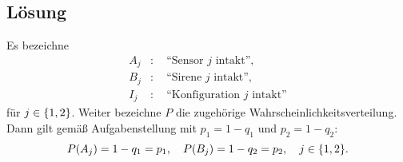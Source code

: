 \documentclass{exercise}
\begin{document}
    \subsection*{Lösung}
    Es bezeichne
    \begin{align*}
        A_j&: \quad \text{``Sensor }j\text{ intakt''},\\
        B_j&: \quad \text{``Sirene }j\text{ intakt''},\\
        I_j&: \quad \text{``Konfiguration }j\text{ intakt''}
    \end{align*}
    für \(j \in \braces*{1, 2}\).
    Weiter bezeichne \(P\) die zugehörige Wahrscheinlichkeitsverteilung.
    Dann gilt gemäß Aufgabenstellung mit \(p_1 = 1 - q_1\) und \(p_2 = 1 - q_2\):
    \[
        P\parentheses*{A_j} = 1 - q_1 = p_1, \quad P\parentheses*{B_j} = 1 - q_2 = p_2, \quad j \in \braces*{1, 2}.
    \]
\end{document}
